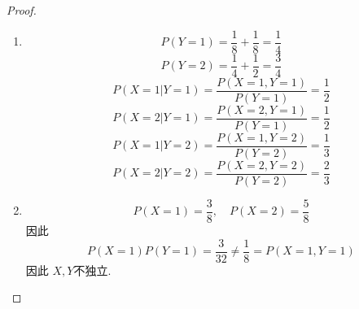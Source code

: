 \documentclass[../main.tex]{subfiles}
\begin{document}
\begin{proof}
  \begin{enumerate}
    \item \[
    P\left( Y= 1 \right)= \frac{1}{8}+ \frac{1}{8}= \frac{1}{4} 
    \] \[
    P\left( Y= 2 \right)= \frac{1}{4}+ \frac{1}{2}= \frac{3}{4} 
    \] \[
    P\left( X= 1|Y= 1 \right)= \frac{P\left( X= 1,Y= 1 \right)  }{P\left( Y= 1 \right)  }=   \frac{1}{2}
    \] \[
    P\left( X= 2|Y= 1 \right)= \frac{P\left( X= 2,Y= 1 \right)  }{P\left( Y= 1 \right)  }= \frac{1}{2}  
    \] \[
    P\left( X= 1|Y= 2 \right)=\frac{P\left( X= 1,Y= 2 \right)  }{P\left( Y= 2 \right)  }=   \frac{1}{3} 
    \] \[
    P\left( X= 2|Y= 2 \right)= \frac{P\left( X= 2,Y= 2 \right)  }{P\left( Y= 2 \right)  }= \frac{2}{3}  
    \]
    \item  \[
    P\left( X= 1 \right)= \frac{3}{8},\quad P\left( X= 2 \right)= \frac{5}{8}  
    \]因此 \[
    P\left( X= 1 \right)P\left( Y= 1 \right)= \frac{3}{32}\neq \frac{1}{8}= P \left( X= 1,Y= 1 \right)   
    \]因此 \(  X,Y  \)不独立. 
  \end{enumerate}
  
\end{proof}
\end{document}
